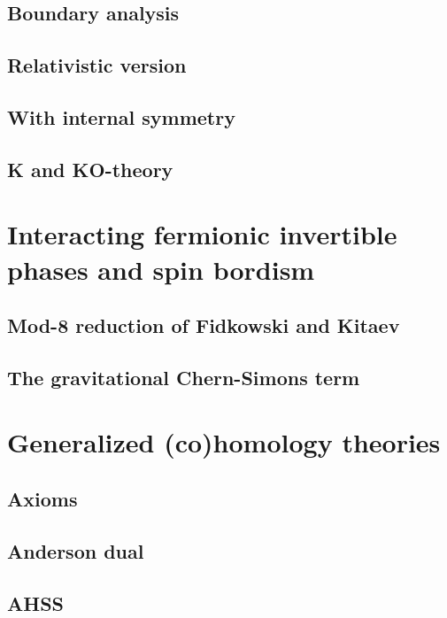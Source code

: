 \documentclass[12pt]{article}
\numberwithin{equation}{section}
\numberwithin{figure}{section}
\theoremstyle{remark}
\begin{document}
\subsection{Boundary analysis}

\subsection{Relativistic version}

\subsection{With internal symmetry}

\subsection{K and KO-theory}

\goodbreak

\section{Interacting fermionic invertible phases and spin bordism}

\subsection{Mod-8 reduction of Fidkowski and Kitaev}

\subsection{The gravitational Chern-Simons term}

\goodbreak

\section{Generalized (co)homology theories}

\subsection{Axioms}

\subsection{Anderson dual}

\subsection{AHSS}
\end{document}
